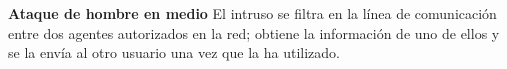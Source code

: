 
\textbf{Ataque de hombre en medio}
El intruso se filtra en la línea de comunicación entre dos agentes autorizados en la red; obtiene la información de uno de ellos y se la envía al otro usuario una vez que la ha utilizado.



